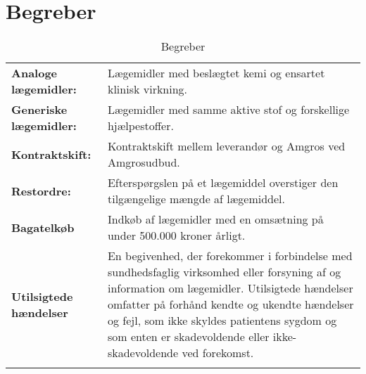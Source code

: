 \section*{Begreber}
\begin{table}[H]
\begin{tabular}{p{4.5cm} p{10.5cm}}
\textbf{Analoge lægemidler:} & Lægemidler med beslægtet kemi og ensartet klinisk virkning. \vspace{0.5cm} \\
\textbf{Generiske lægemidler:} & Lægemidler med samme aktive stof og forskellige hjælpestoffer.\vspace{0.5cm} \\
\textbf{Kontraktskift:} & Kontraktskift mellem leverandør og Amgros ved Amgrosudbud.  \vspace{0.5cm} \\
\textbf{Restordre:} & Efterspørgslen på et lægemiddel overstiger den tilgængelige mængde af lægemiddel.  \vspace{0.5cm} \\
\textbf{Bagatelkøb} & Indkøb af lægemidler med en omsætning på under 500.000 kroner årligt. \vspace{0.5cm} \\
\textbf{Utilsigtede hændelser} & En begivenhed, der forekommer i forbindelse med sundhedsfaglig virksomhed eller forsyning af og information om lægemidler. Utilsigtede hændelser omfatter på forhånd kendte og ukendte hændelser og fejl, som ikke skyldes patientens sygdom og som enten er skadevoldende eller ikke-skadevoldende ved forekomst. %
 \vspace{0.5cm} \\
& \vspace{0.5cm} \\
\end{tabular}
\caption{Begreber}
\label{table:begreber}
\end{table}




